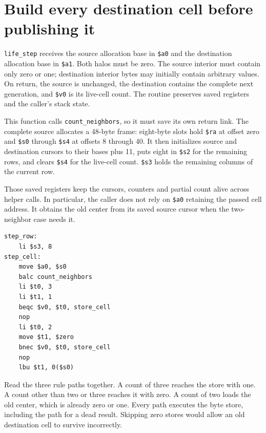 \section{Build every destination cell before publishing it}

\texttt{life\_step} receives the source allocation base in \texttt{\$a0} and the
destination allocation base in \texttt{\$a1}. Both halos must be zero. The source
interior must contain only zero or one; destination interior bytes may initially
contain arbitrary values. On return, the source is unchanged, the destination
contains the complete next generation, and \texttt{\$v0} is its live-cell count.
The routine preserves saved registers and the caller's stack state.

This function calls \texttt{count\_neighbors}, so it must save its own return link.
The complete source allocates a 48-byte frame: eight-byte slots hold \texttt{\$ra}
at offset zero and \texttt{\$s0} through \texttt{\$s4} at offsets 8 through 40.
It then initializes source and destination cursors to their bases plus 11, puts
eight in \texttt{\$s2} for the remaining rows, and clears \texttt{\$s4} for the
live-cell count. \texttt{\$s3} holds the remaining columns of the current row.

Those saved registers keep the cursors, counters and partial count alive across
helper calls. In particular, the caller does not rely on \texttt{\$a0} retaining
the passed cell address. It obtains the old center from its saved source cursor
when the two-neighbor case needs it.

\noindent\begin{minipage}{\linewidth}
  \begin{verbatim}
step_row:
    li $s3, 8
step_cell:
    move $a0, $s0
    balc count_neighbors
    li $t0, 3
    li $t1, 1
    beqc $v0, $t0, store_cell
    nop
    li $t0, 2
    move $t1, $zero
    bnec $v0, $t0, store_cell
    nop
    lbu $t1, 0($s0)
\end{verbatim}
\end{minipage}

Read the three rule paths together. A count of three reaches the store with one.
A count other than two or three reaches it with zero. A count of two loads the
old center, which is already zero or one. Every path executes the byte store,
including the path for a dead result. Skipping zero stores would allow an old
destination cell to survive incorrectly.

